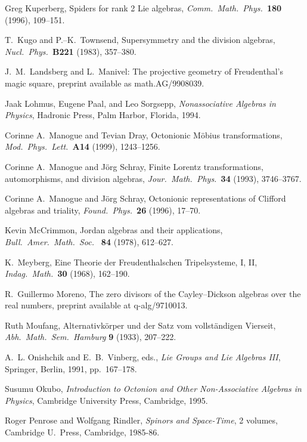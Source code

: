 \begin{thebibliography}{10}
 Greg Kuperberg, Spiders for rank 2 Lie algebras,
{\sl Comm.\ Math.\ Phys.\ }{\bf 180} (1996), 109--151.

 T.\ Kugo and P.--K.\ Townsend, Supersymmetry and the 
division algebras, {\sl Nucl.\ Phys.\ }{\bf B221} (1983), 357--380. 
 
 J.\ M.\ Landsberg and L.\ Manivel: The projective geometry of   
Freudenthal's magic square, preprint available as math.AG/9908039.   
 
 Jaak Lohmus, Eugene Paal, and Leo Sorgsepp,    
{\sl Nonassociative Algebras in Physics}, Hadronic Press, Palm   
Harbor, Florida, 1994.   

 Corinne A.\ Manogue and Tevian Dray, Octonionic    
M\"obius transformations, {\sl Mod.\ Phys.\ Lett.\ }{\bf A14} (1999), 
1243--1256. 

 Corinne A.\ Manogue and J\"org Schray, Finite Lorentz   
transformations, automorphisms, and division algebras, {\sl Jour.\   
Math.\ Phys.\ }{\bf 34} (1993), 3746--3767.   
 
 Corinne A.\ Manogue and J\"org Schray, Octonionic    
representations of Clifford algebras and triality, {\sl Found.\    
Phys.\ }{\bf 26} (1996), 17--70.    
 
 Kevin McCrimmon, Jordan algebras and their applications,   
{\sl Bull.\ Amer.\ Math.\ Soc.\ } {\bf 84} (1978), 612--627.     

\bibitem{Meyberg} K.\ Meyberg, Eine Theorie der Freudenthalschen 
Tripelsysteme, I, II, {\sl Indag.\ Math.\ }{\bf 30} (1968),
162--190.
 
 R.\ Guillermo Moreno, The zero divisors of the    
Cayley--Dickson algebras over the real numbers, preprint available    
at q-alg/9710013.   
  
 Ruth Moufang, Alternativk\"orper und der Satz vom  
vollst\"andigen Vierseit, {\sl Abh.\ Math.\ Sem.\ Hamburg} {\bf 9} 
(1933), 207--222. 
  
 A.\ L. Onishchik and E.\ B.\ Vinberg, eds., {\sl Lie Groups 
and Lie Algebras III}, Springer, Berlin, 1991, pp.\ 167--178.   
   
\bibitem{Okubo} Susumu Okubo, {\sl Introduction to Octonion and Other    
Non-Associative Algebras in Physics}, Cambridge University Press,   
Cambridge, 1995.   
 
 Roger Penrose and Wolfgang Rindler, {\sl Spinors and  
Space-Time}, 2 volumes, Cambridge U.\ Press, Cambridge, 1985-86. 
  

\end{thebibliography}
